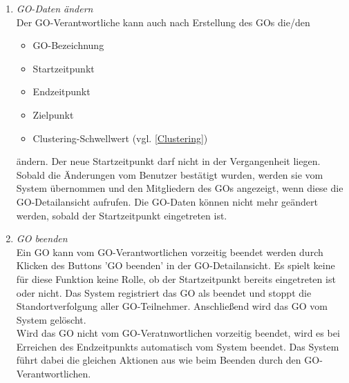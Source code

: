 \documentclass[parskip=full]{scrartcl}
\def\threedigits#1{%
  \ifnum#1<100 0\fi
  \ifnum#1<10 0\fi
  \number#1}
\begin{document}
\begin{enumerate}[label={\textbf{/F\protect\threedigits{\theenumi}0/}}, leftmargin=*, resume]	
	\item \textit{GO-Daten ändern}\label{GO Daten ändern} \\
	Der GO-Verantwortliche kann auch nach Erstellung des GOs die/den
	\begin{itemize}
		\item GO-Bezeichnung
		\item Startzeitpunkt
		\item Endzeitpunkt
		\item Zielpunkt
		\item \colorbox{shadecolor}{Clustering-Schwellwert (vgl. \ref{Clustering})}
	\end{itemize}
	ändern. Der neue Startzeitpunkt darf nicht in der Vergangenheit liegen. Sobald die Änderungen vom Benutzer bestätigt wurden, werden sie vom System übernommen und den Mitgliedern des GOs angezeigt, wenn diese die GO-Detailansicht aufrufen. Die GO-Daten können nicht mehr geändert werden, sobald der Startzeitpunkt eingetreten ist.
	
	\item \textit{GO beenden}\label{GO beenden} \\
	Ein GO kann vom GO-Verantwortlichen vorzeitig beendet werden durch Klicken des Buttons 'GO beenden' in der GO-Detailansicht. Es spielt keine für diese Funktion keine Rolle, ob der Startzeitpunkt bereits eingetreten ist oder nicht. Das System registriert das GO als beendet und stoppt die Standortverfolgung aller GO-Teilnehmer. Anschließend wird das GO vom System gelöscht. \\
	Wird das GO nicht vom GO-Veratnwortlichen vorzeitig beendet, wird es bei Erreichen des Endzeitpunkts automatisch vom System beendet. Das System führt dabei die gleichen Aktionen aus wie beim Beenden durch den GO-Verantwortlichen.
	
\end{enumerate}
\end{document}
